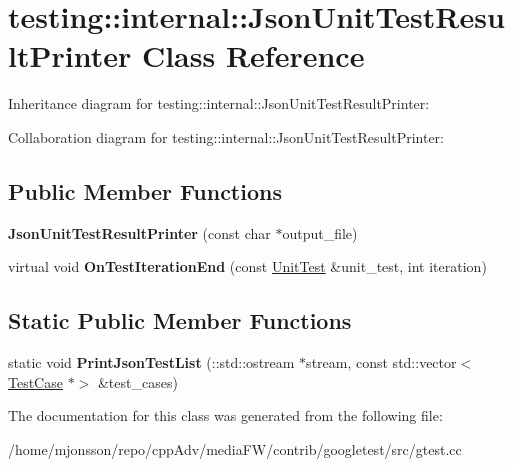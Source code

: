 \hypertarget{classtesting_1_1internal_1_1JsonUnitTestResultPrinter}{}\section{testing\+:\+:internal\+:\+:Json\+Unit\+Test\+Result\+Printer Class Reference}
\label{classtesting_1_1internal_1_1JsonUnitTestResultPrinter}


Inheritance diagram for testing\+:\+:internal\+:\+:Json\+Unit\+Test\+Result\+Printer\+:


Collaboration diagram for testing\+:\+:internal\+:\+:Json\+Unit\+Test\+Result\+Printer\+:
\subsection*{Public Member Functions}
\begin{DoxyCompactItemize}
\item 
\mbox{\label{classtesting_1_1internal_1_1JsonUnitTestResultPrinter_a273623decde1be18db45e95594f9d501}} 
{\bfseries Json\+Unit\+Test\+Result\+Printer} (const char $\ast$output\+\_\+file)
\item 
\mbox{\label{classtesting_1_1internal_1_1JsonUnitTestResultPrinter_a44edb54cf1ab8cdcd56bda5058b8f1d6}} 
virtual void {\bfseries On\+Test\+Iteration\+End} (const \hyperlink{classtesting_1_1UnitTest}{Unit\+Test} \&unit\+\_\+test, int iteration)
\end{DoxyCompactItemize}
\subsection*{Static Public Member Functions}
\begin{DoxyCompactItemize}
\item 
\mbox{\label{classtesting_1_1internal_1_1JsonUnitTestResultPrinter_a5f2b7e7c90cbdd2029ddaa6c1ad75de0}} 
static void {\bfseries Print\+Json\+Test\+List} (\+::std\+::ostream $\ast$stream, const std\+::vector$<$ \hyperlink{classtesting_1_1TestCase}{Test\+Case} $\ast$$>$ \&test\+\_\+cases)
\end{DoxyCompactItemize}


The documentation for this class was generated from the following file\+:\begin{DoxyCompactItemize}
\item 
/home/mjonsson/repo/cpp\+Adv/media\+F\+W/contrib/googletest/src/gtest.\+cc\end{DoxyCompactItemize}
